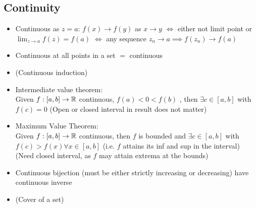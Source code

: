\subsection*{Continuity}
\begin{itemize}
      \item Continuous as $z=a$:
            \newline $f(x) \to f(y)$ as $x \to y$
            \newline $\iff$ either not limit point or $\lim_{z \to a} f(z) = f(a)$
            \newline $\iff$ any sequence $z_n \to a \implies f(z_n) \to f(a)$
      \item Continuous at all points in a set $=$ continuous
      \item (Continuous induction)
      \item Intermediate value theorem: \\
            Given $f: [a,b] \to \mathbb{R}$ continuous,  $f(a)<0<f(b)$ , then $\exists c \in  [a,b]$  with  $f(c) = 0 $
            (Open or closed interval in result does not matter)

      \item Maximum Value Theorem: \\
            Given $ f: [a,b] \to \mathbb{R} $ continuous, then $ f $  is bounded and $ \exists c \in [a,b] $ with $f(c) > f(x) \forall x \in [a,b] $
            (i.e. $f$ attains its inf and sup in the interval)
            (Need closed interval, as $f$ may attain extrema at the bounds)
      \item Continuous bijection (must be either strictly increasing or decreasing) have continuous inverse
      \item (Cover of a set)
\end{itemize}

